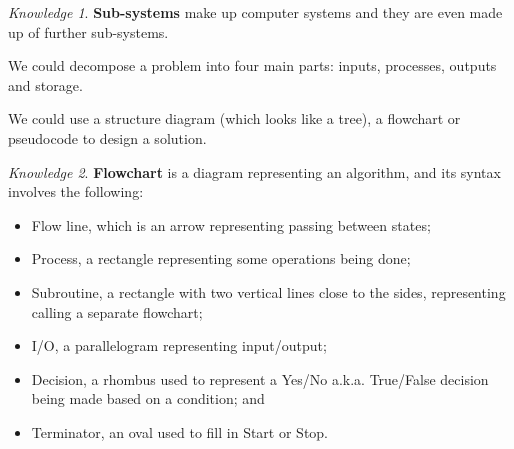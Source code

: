 \documentclass[8pt]{article}
\theoremstyle{remark}
\newtheorem{knowledge}{Knowledge}[subsection]
\begin{document}
        \begin{knowledge}
            \textbf{Sub-systems} make up computer systems and they are even made up of further sub-systems.

            We could decompose a problem into four main parts: inputs, processes, outputs and storage.

            We could use a structure diagram (which looks like a tree), a flowchart or pseudocode to design a solution.
        \end{knowledge}

        \begin{knowledge}
            \textbf{Flowchart} is a diagram representing an algorithm, and its syntax involves the following:
            \begin{itemize}
                \item Flow line, which is an arrow representing passing between states;
                \item Process, a rectangle representing some operations being done;
                \item Subroutine, a rectangle with two vertical lines close to the sides, representing calling a separate flowchart;
                \item I/O, a parallelogram representing input/output;
                \item Decision, a rhombus used to represent a Yes/No a.k.a. True/False decision being made based on a condition; and
                \item Terminator, an oval used to fill in Start or Stop.
            \end{itemize}
        \end{knowledge}
\end{document}
